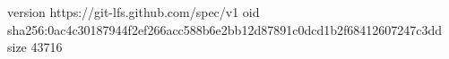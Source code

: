 version https://git-lfs.github.com/spec/v1
oid sha256:0ac4c30187944f2ef266acc588b6e2bb12d87891c0dcd1b2f68412607247c3dd
size 43716
